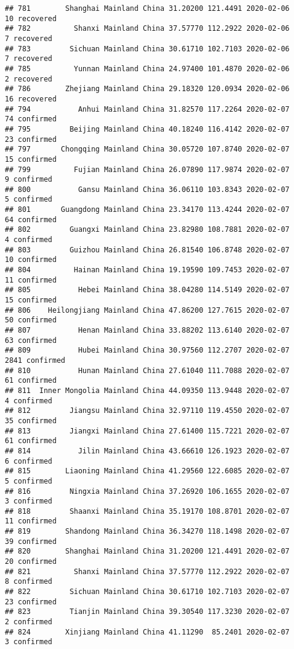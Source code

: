 \documentclass[
]{article}
\begin{document}
\begin{verbatim}
## 781        Shanghai Mainland China 31.20200 121.4491 2020-02-06    10 recovered
## 782          Shanxi Mainland China 37.57770 112.2922 2020-02-06     7 recovered
## 783         Sichuan Mainland China 30.61710 102.7103 2020-02-06     7 recovered
## 785          Yunnan Mainland China 24.97400 101.4870 2020-02-06     2 recovered
## 786        Zhejiang Mainland China 29.18320 120.0934 2020-02-06    16 recovered
## 794           Anhui Mainland China 31.82570 117.2264 2020-02-07    74 confirmed
## 795         Beijing Mainland China 40.18240 116.4142 2020-02-07    23 confirmed
## 797       Chongqing Mainland China 30.05720 107.8740 2020-02-07    15 confirmed
## 799          Fujian Mainland China 26.07890 117.9874 2020-02-07     9 confirmed
## 800           Gansu Mainland China 36.06110 103.8343 2020-02-07     5 confirmed
## 801       Guangdong Mainland China 23.34170 113.4244 2020-02-07    64 confirmed
## 802         Guangxi Mainland China 23.82980 108.7881 2020-02-07     4 confirmed
## 803         Guizhou Mainland China 26.81540 106.8748 2020-02-07    10 confirmed
## 804          Hainan Mainland China 19.19590 109.7453 2020-02-07    11 confirmed
## 805           Hebei Mainland China 38.04280 114.5149 2020-02-07    15 confirmed
## 806    Heilongjiang Mainland China 47.86200 127.7615 2020-02-07    50 confirmed
## 807           Henan Mainland China 33.88202 113.6140 2020-02-07    63 confirmed
## 809           Hubei Mainland China 30.97560 112.2707 2020-02-07  2841 confirmed
## 810           Hunan Mainland China 27.61040 111.7088 2020-02-07    61 confirmed
## 811  Inner Mongolia Mainland China 44.09350 113.9448 2020-02-07     4 confirmed
## 812         Jiangsu Mainland China 32.97110 119.4550 2020-02-07    35 confirmed
## 813         Jiangxi Mainland China 27.61400 115.7221 2020-02-07    61 confirmed
## 814           Jilin Mainland China 43.66610 126.1923 2020-02-07     6 confirmed
## 815        Liaoning Mainland China 41.29560 122.6085 2020-02-07     5 confirmed
## 816         Ningxia Mainland China 37.26920 106.1655 2020-02-07     3 confirmed
## 818         Shaanxi Mainland China 35.19170 108.8701 2020-02-07    11 confirmed
## 819        Shandong Mainland China 36.34270 118.1498 2020-02-07    39 confirmed
## 820        Shanghai Mainland China 31.20200 121.4491 2020-02-07    20 confirmed
## 821          Shanxi Mainland China 37.57770 112.2922 2020-02-07     8 confirmed
## 822         Sichuan Mainland China 30.61710 102.7103 2020-02-07    23 confirmed
## 823         Tianjin Mainland China 39.30540 117.3230 2020-02-07     2 confirmed
## 824        Xinjiang Mainland China 41.11290  85.2401 2020-02-07     3 confirmed

\end{verbatim}
\end{document}
